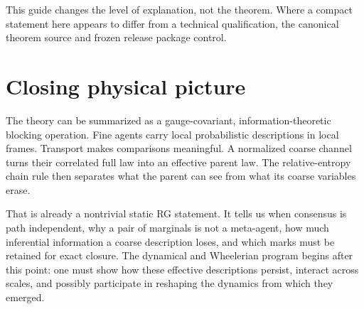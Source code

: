 \documentclass[11pt,letterpaper]{article}
\begin{document}
This guide changes the level of explanation, not the theorem. Where a compact statement here appears to differ from a technical qualification, the canonical theorem source and frozen release package control.

\section{Closing physical picture}

The theory can be summarized as a gauge-covariant, information-theoretic blocking operation. Fine agents carry local probabilistic descriptions in local frames. Transport makes comparisons meaningful. A normalized coarse channel turns their correlated full law into an effective parent law. The relative-entropy chain rule then separates what the parent can see from what its coarse variables erase.

That is already a nontrivial static RG statement. It tells us when consensus is path independent, why a pair of marginals is not a meta-agent, how much inferential information a coarse description loses, and which marks must be retained for exact closure. The dynamical and Wheelerian program begins after this point: one must show how these effective descriptions persist, interact across scales, and possibly participate in reshaping the dynamics from which they emerged.
\end{document}
